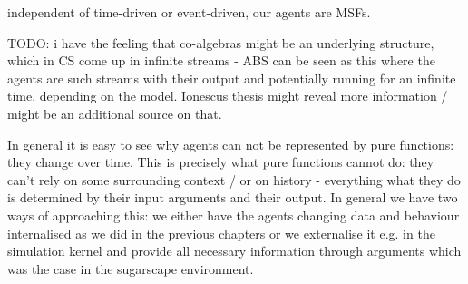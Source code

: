 independent of time-driven or event-driven, our agents are MSFs.

TODO: i have the feeling that co-algebras might be an underlying structure, which in CS come up in infinite streams - ABS can be seen as this where the agents are such streams with their output and potentially running for an infinite time, depending on the model. Ionescus thesis might reveal more information / might be an additional source on that.

In general it is easy to see why agents can not be represented by pure functions: they change over time. This is precisely what pure functions cannot do: they can't rely on some surrounding context / or on history - everything what they do is determined by their input arguments and their output. In general we have two ways of approaching this: we either have the agents changing data and behaviour internalised as we did in the previous chapters or we externalise it e.g. in the simulation kernel and provide all necessary information through arguments which was the case in the sugarscape environment.